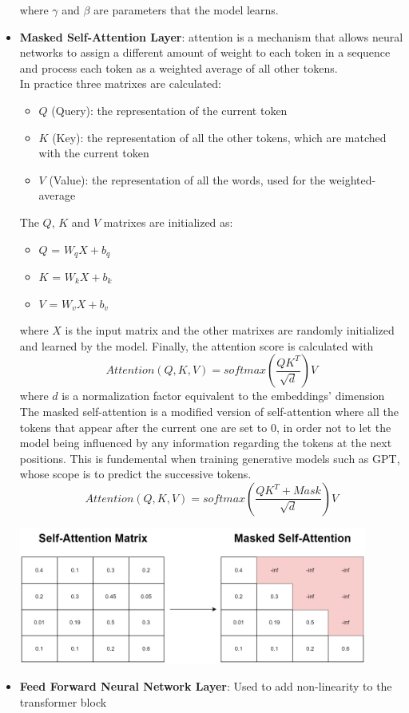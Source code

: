 \begin{itemize}
    where $\gamma$ and $\beta$ are parameters that the model learns.
    \item \textbf{Masked Self-Attention Layer}: attention is a mechanism that allows neural networks to assign a different amount of weight to each token in a sequence and process each token as a weighted average of all other tokens. \\
    In practice three matrixes are calculated:
    \begin{itemize}
        \item $Q$ (Query): the representation of the current token
        \item $K$ (Key): the representation of all the other tokens, which are matched with the current token
        \item $V$ (Value): the representation of all the words, used for the weighted-average
    \end{itemize}
    The $Q$, $K$ and $V$ matrixes are initialized as:
    \begin{itemize}
        \item $Q$ = $W_qX + b_q$ 
        \item $K$ = $W_kX + b_k$ 
        \item $V$ = $W_vX + b_v$
    \end{itemize}
    where $X$ is the input matrix and the other matrixes are randomly initialized and learned by the model.
    Finally, the attention score is calculated with
    \begin{equation*}
        Attention(Q,K,V) = softmax \left(\frac{QK^T}{\sqrt{d}}\right)V
    \end{equation*}
    where $d$ is a normalization factor equivalent to the embeddings' dimension \\
    The masked self-attention is a modified version of self-attention where all the tokens that appear after the current one are set to $0$, in order not to let the model being influenced by any information regarding the tokens at the next positions. This is fundemental when training generative models such as GPT, whose scope is to predict the successive tokens.
    \begin{equation*}
        Attention(Q,K,V) = softmax\left(\frac{QK^T + Mask}{\sqrt{d}}\right)V
    \end{equation*}

    \includegraphics[width=0.90\textwidth]{images/masked_self_attention.drawio.png}

    \item \textbf{Feed Forward Neural Network Layer}: Used to add non-linearity to the transformer block
\end{itemize}

